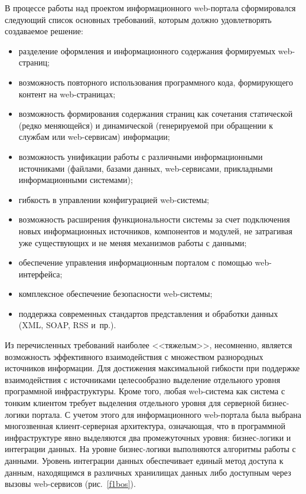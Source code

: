 \begin{multicols}{2}
 В процессе работы над проектом информационного web-портала сформировался
следующий список основных требований, которым должно удов\-ле\-тво\-рять
создаваемое решение:
 \begin{itemize}
\item разделение оформления и информационного содержания формируемых
web-страниц;
\item возможность повторного использования программного кода, формирующего
контент на web-страницах;
\item возможность формирования содержания страниц как сочетания статической (редко
меняющейся) и динамической (генерируемой при обращении к службам или
web-сервисам) информации;
\item возможность унификации работы с различными информационными источниками
(файлами, базами данных, web-сервисами, прикладными информационными системами);
\item гибкость в управлении конфигурацией web-системы;
\item возможность расширения функциональности системы за счет подключения
новых информационных источников, компонентов и модулей, не затрагивая уже
существующих и не меняя механизмов работы с данными;
\item обеспечение управления информационным порталом с помощью web-интерфейса;
\item комплексное обеспечение безопасности web-системы;
\item поддержка современных стандартов пред\-став\-ле\-ния и обработки данных
(XML, SOAP, RSS и~пр.).
\end{itemize}

 Из перечисленных требований наиболее <<тяжелым>>, несомненно, является
возможность эффективного взаимодействия с множеством разнородных источников
информации. Для достижения максимальной гибкости при поддержке взаимодействия с
источниками целесообразно выделение отдельного уровня программной инфраструктуры.
Кроме того, любая web-система как система с тонким клиентом требует выделения
отдельного уровня для серверной бизнес-логики портала. С учетом этого для
информационного web-портала была выбрана многозвенная клиент-серверная
архитектура, означающая, что в программной инфраструктуре явно выделяются два
промежуточных уровня: бизнес-логики и интеграции данных. На уровне бизнес-логики
выполняются алгоритмы работы с данными. Уровень интеграции данных обеспечивает
единый метод доступа к данным, находящимся в различных хранилищах данных либо
доступным через вызовы web-сервисов (рис.~\ref{f1bos}).


\end{multicols}
